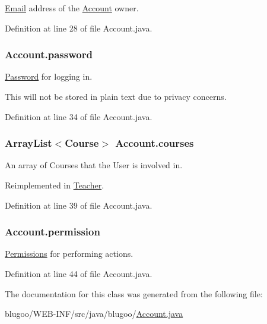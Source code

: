 \hyperlink{classEmail}{Email} address of the \hyperlink{classAccount}{Account} owner. 



Definition at line 28 of file Account.java.\hypertarget{classAccount_d50b726ed8997abb1ac362fd31f183a2}{
\subsubsection{ {\bf Account.password}}}
\label{classAccount_d50b726ed8997abb1ac362fd31f183a2}


\hyperlink{classPassword}{Password} for logging in. 

This will not be stored in plain text due to privacy concerns. 

Definition at line 34 of file Account.java.\hypertarget{classAccount_465319ae346d4b7e3233f7c3325443dd}{
\subsubsection{\setlength{\rightskip}{0pt plus 5cm}ArrayList$<${\bf Course}$>$ {\bf Account.courses}}}
\label{classAccount_465319ae346d4b7e3233f7c3325443dd}


An array of Courses that the User is involved in. 



Reimplemented in \hyperlink{classTeacher_ee7404da23833c44e12c5c460f480931}{Teacher}.

Definition at line 39 of file Account.java.\hypertarget{classAccount_a633f729217a58a51d6878d0c20940cf}{
\subsubsection{ {\bf Account.permission}}}
\label{classAccount_a633f729217a58a51d6878d0c20940cf}


\hyperlink{classPermissions}{Permissions} for performing actions. 



Definition at line 44 of file Account.java.

The documentation for this class was generated from the following file:\begin{CompactItemize}
\item 
blugoo/WEB-INF/src/java/blugoo/\hyperlink{Account_8java}{Account.java}\end{CompactItemize}
